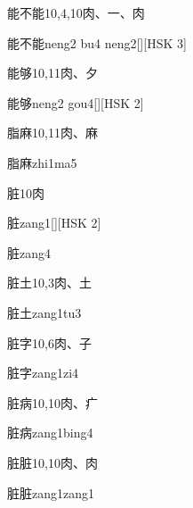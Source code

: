 \begin{entry}{能不能}{10,4,10}{⾁、⼀、⾁}
  \begin{phonetics}{能不能}{neng2 bu4 neng2}[][HSK 3]
  \end{phonetics}
\end{entry}

\begin{entry}{能够}{10,11}{⾁、⼣}
  \begin{phonetics}{能够}{neng2 gou4}[][HSK 2]
  \end{phonetics}
\end{entry}

\begin{entry}{脂麻}{10,11}{⾁、⿇}
  \begin{phonetics}{脂麻}{zhi1ma5}
  \end{phonetics}
\end{entry}

\begin{entry}{脏}{10}{⾁}
  \begin{phonetics}{脏}{zang1}[][HSK 2]
  \end{phonetics}
  \begin{phonetics}{脏}{zang4}
  \end{phonetics}
\end{entry}

\begin{entry}{脏土}{10,3}{⾁、⼟}
  \begin{phonetics}{脏土}{zang1tu3}
  \end{phonetics}
\end{entry}

\begin{entry}{脏字}{10,6}{⾁、⼦}
  \begin{phonetics}{脏字}{zang1zi4}
  \end{phonetics}
\end{entry}

\begin{entry}{脏病}{10,10}{⾁、⽧}
  \begin{phonetics}{脏病}{zang1bing4}
  \end{phonetics}
\end{entry}

\begin{entry}{脏脏}{10,10}{⾁、⾁}
  \begin{phonetics}{脏脏}{zang1zang1}
  \end{phonetics}
\end{entry}


